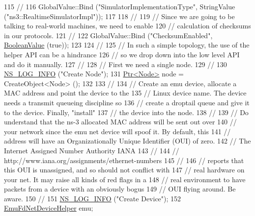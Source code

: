 \begin{DoxyCode}
115   \textcolor{comment}{//}
116   GlobalValue::Bind (\textcolor{stringliteral}{"SimulatorImplementationType"}, StringValue (\textcolor{stringliteral}{"ns3::RealtimeSimulatorImpl"}));
117 
118   \textcolor{comment}{//}
119   \textcolor{comment}{// Since we are going to be talking to real-world machines, we need to enable}
120   \textcolor{comment}{// calculation of checksums in our protocols.}
121   \textcolor{comment}{//}
122   GlobalValue::Bind (\textcolor{stringliteral}{"ChecksumEnabled"}, \hyperlink{classns3_1_1BooleanValue}{BooleanValue} (\textcolor{keyword}{true}));
123 
124   \textcolor{comment}{//}
125   \textcolor{comment}{// In such a simple topology, the use of the helper API can be a hindrance}
126   \textcolor{comment}{// so we drop down into the low level API and do it manually.}
127   \textcolor{comment}{//}
128   \textcolor{comment}{// First we need a single node.}
129   \textcolor{comment}{//}
130   \hyperlink{group__logging_gafbd73ee2cf9f26b319f49086d8e860fb}{NS\_LOG\_INFO} (\textcolor{stringliteral}{"Create Node"});
131   \hyperlink{classns3_1_1Ptr}{Ptr<Node>} node = CreateObject<Node> ();
132 
133   \textcolor{comment}{//}
134   \textcolor{comment}{// Create an emu device, allocate a MAC address and point the device to the}
135   \textcolor{comment}{// Linux device name.  The device needs a transmit queueing discipline so}
136   \textcolor{comment}{// create a droptail queue and give it to the device.  Finally, "install"}
137   \textcolor{comment}{// the device into the node.}
138   \textcolor{comment}{//}
139   \textcolor{comment}{// Do understand that the ns-3 allocated MAC address will be sent out over}
140   \textcolor{comment}{// your network since the emu net device will spoof it.  By default, this}
141   \textcolor{comment}{// address will have an Organizationally Unique Identifier (OUI) of zero.}
142   \textcolor{comment}{// The Internet Assigned Number Authority IANA}
143   \textcolor{comment}{//}
144   \textcolor{comment}{//  http://www.iana.org/assignments/ethernet-numbers}
145   \textcolor{comment}{//}
146   \textcolor{comment}{// reports that this OUI is unassigned, and so should not conflict with}
147   \textcolor{comment}{// real hardware on your net.  It may raise all kinds of red flags in a}
148   \textcolor{comment}{// real environment to have packets from a device with an obviously bogus}
149   \textcolor{comment}{// OUI flying around.  Be aware.}
150   \textcolor{comment}{//}
151   \hyperlink{group__logging_gafbd73ee2cf9f26b319f49086d8e860fb}{NS\_LOG\_INFO} (\textcolor{stringliteral}{"Create Device"});
152   \hyperlink{classns3_1_1EmuFdNetDeviceHelper}{EmuFdNetDeviceHelper} emu;

\end{DoxyCode}
